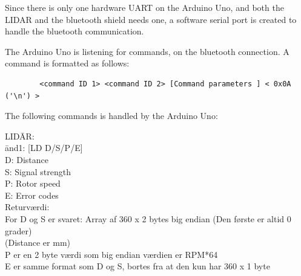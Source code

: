 Since there is only one hardware UART on the Arduino Uno, and both the LIDAR and the bluetooth shield needs one, a software serial port is created to handle the bluetooth communication. 

The Arduino Uno is listening for commands, on the bluetooth connection. A command is formatted as follows: 
\begin{verbatim}
		<command ID 1> <command ID 2> [Command parameters ] < 0x0A ('\n') >
\end{verbatim}
The following commands is handled by the Arduino Uno: 
\begin{tabbing}	
{LID}\={AR:}\\
\={and1: [LD D/S/P/E]} \\
\> \> D: Distance \\
\> \> S: Signal strength\\
\> \> P: Rotor speed\\
\> \> E: Error codes\\
\> Returværdi:\\
\> \> {For D og S er svaret: Array af 360 x 2 bytes big endian (Den første er altid 0 grader)} \\ \> \> {(Distance er mm)} \\
\> \> {P er en 2 byte værdi som big endian værdien er RPM*64} \\
\> \> {E er samme format som D og S, bortes fra at den kun har 360 x 1 byte} \\
\end{tabbing}	


